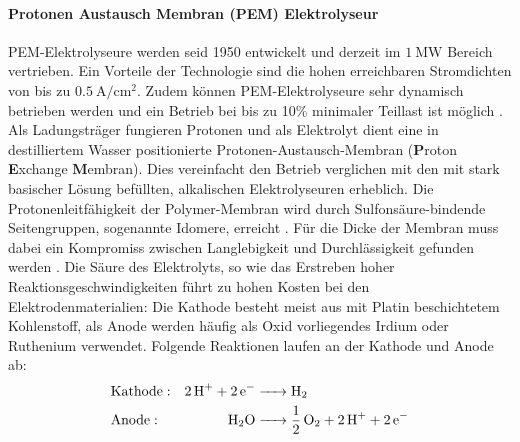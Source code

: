 \paragraph{Protonen Austausch Membran (PEM) Elektrolyseur}
\label{par:Protonen Austausch Membran (PEM) Elektrolyseur}
PEM-Elektrolyseure werden seid 1950 entwickelt und derzeit im $\SI{1}{\mega\W}$ Bereich vertrieben. Ein Vorteile der Technologie sind die hohen erreichbaren Stromdichten von bis zu $\SI{0,5}{\A\per\cm\squared}$. Zudem können PEM-Elektrolyseure sehr dynamisch betrieben werden und ein Betrieb bei bis zu 10\% minimaler Teillast ist möglich \citep{tremel_electrolysisfundamental_2018}.\\
Als Ladungsträger fungieren Protonen und als Elektrolyt dient eine in destilliertem Wasser positionierte Protonen-Austausch-Membran (\textbf{P}roton \textbf{E}xchange \textbf{M}embran). Dies vereinfacht den Betrieb verglichen mit den mit stark basischer Lösung befüllten, alkalischen Elektrolyseuren erheblich. Die Protonenleitfähigkeit der Polymer-Membran wird durch Sulfonsäure-bindende Seitengruppen, sogenannte Idomere, erreicht \citep{tjarks_pem-elektrolyse-systeme_2017}.  Für die Dicke der Membran muss dabei ein Kompromiss zwischen Langlebigkeit und Durchlässigkeit gefunden werden \citep{falcao_review_2020}. Die Säure des Elektrolyts, so wie das Erstreben hoher Reaktionsgeschwindigkeiten führt zu hohen Kosten bei den Elektrodenmaterialien: Die Kathode besteht meist aus mit Platin beschichtetem Kohlenstoff, als Anode werden häufig als Oxid vorliegendes Irdium oder Ruthenium verwendet. Folgende Reaktionen laufen an der Kathode und Anode ab:
\begin{align}
  \ce{	&{Kathode:} &2H^+ + 2e^- &-> H2\\
  		&{Anode:} &H2O  &->  1/2O2 + 2H^+ + 2 e^-}
\end{align}
  		
